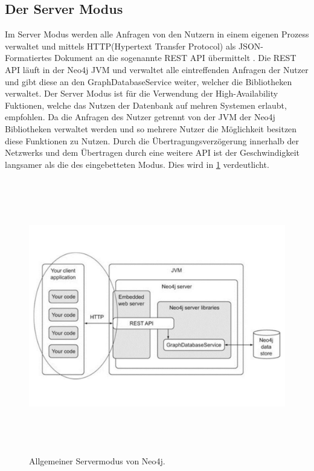 \subsection{Der Server Modus}
Im Server Modus werden alle Anfragen von den Nutzern in einem eigenen Prozess verwaltet und mittels HTTP(Hypertext Transfer Protocol) als JSON-Formatiertes Dokument an die sogenannte REST API übermittelt \parencite{robinson2013graph}. Die REST API läuft in der Neo4j JVM und  verwaltet alle eintreffenden Anfragen der Nutzer und gibt diese an den GraphDatabaseService weiter, welcher die Bibliotheken verwaltet. \newline 
Der Server Modus ist für die Verwendung der High-Availability Fuktionen, welche das Nutzen der Datenbank auf mehren Systemen erlaubt, empfohlen\parencite{raj2015neo4j}. Da die Anfragen des Nutzer getrennt von der JVM der Neo4j Bibliotheken verwaltet werden und so mehrere Nutzer die Möglichkeit besitzen diese Funktionen zu Nutzen. Durch die  Übertragungsverzögerung innerhalb der Netzwerks und dem Übertragen durch eine weitere API ist der Geschwindigkeit langsamer als die des eingebetteten Modus. Dies wird in \ref{fig:Server} verdeutlicht.
\begin{figure}[!htb]
	\centering
	\includegraphics [width=14cm, height=12cm]{Figures/Server}
	\caption[Server]{Allgemeiner Servermodus von Neo4j.}
	\label{fig:Server}
	\FloatBarrier
\end{figure}

